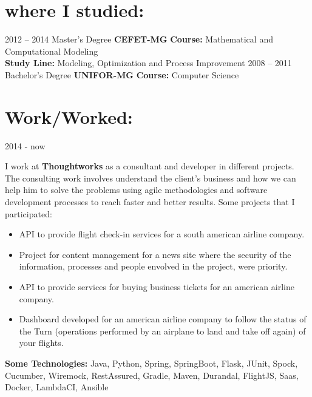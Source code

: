 \documentclass[]{friggeri-cv}
\begin{document}
\section{where I studied:}

\begin{entrylist}
  \entry
    {2012 – 2014}
    {Master's Degree}
    {\textbf{CEFET-MG}}
    {\textbf{Course:} Mathematical and Computational Modeling\\ \textbf{Study Line:} Modeling, Optimization and Process Improvement}
  \entry
    {2008 – 2011}
    {Bachelor's Degree}
    {\textbf{UNIFOR-MG}}
    {\textbf{Course:} Computer Science}  
\end{entrylist}

\section{Work/Worked:}
\begin{entrylist}
  \entry
    {2014 - now}
    {{\normalfont I work at \textbf{Thoughtworks} as a consultant and developer in different projects. The consulting work involves understand the client's business and how we can help him to solve the problems using agile methodologies and software development processes to reach faster and better results. Some projects that I participated:\\
    \begin{itemize} 
        \item API to provide flight check-in services for a south american airline company.\\
        \item Project for content management for a news site where the security of the information, processes and people envolved in the project, were priority.\\
        \item API to provide services for buying business tickets for an american airline company.\\
        \item Dashboard developed for an american airline company to follow the status of the Turn (operations performed by an airplane to land and take off again) of your flights.\\
\end{itemize}
\textbf{Some Technologies:} Java, Python, Spring, SpringBoot, Flask, JUnit, Spock, Cucumber, Wiremock, RestAssured, Gradle, Maven, Durandal, FlightJS, Saas, Docker, LambdaCI, Ansible
    }}{}{}
\end{entrylist}
\end{document}
